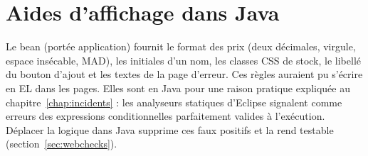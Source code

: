 

\section{Aides d'affichage dans Java}
Le bean  (portée application) fournit le format des prix (deux décimales, virgule, espace insécable,
MAD), les initiales d'un nom, les classes CSS de stock, le libellé du bouton d'ajout et les textes de la page d'erreur.
Ces règles auraient pu s'écrire en EL dans les pages. Elles sont en Java pour une raison pratique expliquée au
chapitre~\ref{chap:incidents} : les analyseurs statiques d'Eclipse signalent comme erreurs des expressions
conditionnelles parfaitement valides à l'exécution. Déplacer la logique dans Java supprime ces faux positifs et la rend
testable (section~\ref{sec:webchecks}).

